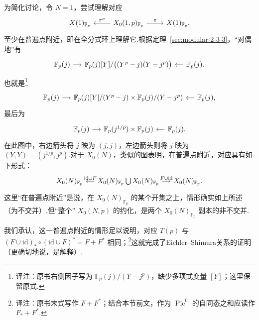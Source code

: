 为简化讨论，令 $N=1$，尝试理解对应
\begin{equation*}
\begin{tikzcd}
X(1)_{\mathbb F_p} & X_0(1,p)_{\mathbb F_p} \arrow[l,"\pi^p"'] \arrow[r,"\pi"] & X(1)_{\mathbb F_p},
\end{tikzcd}
\end{equation*}
至少在普遍点附近，即在全分式环上理解它.根据定理~\ref{sec:modular-2-3-3}，``对偶地''有
\begin{equation*}
\begin{tikzcd}[column sep=small]
\mathbb F_p(j) \arrow[r] & {\mathbb F_p(j)[Y]/\bigl((Y^p-j)(Y-j^p)\bigr)} & \mathbb F_p(j) \arrow[l].
\end{tikzcd}
\end{equation*}
也就是\footnote{译注：原书右侧因子写为 $\mathbb F_p(j)/(Y-j^p)$，缺少多项式变量 $[Y]$；这里保留原式.}
\begin{equation*}
\begin{tikzcd}[column sep=small]
\mathbb F_p(j) \arrow[r] & {\mathbb F_p(j)[Y]/(Y^p-j)\times\mathbb F_p(j)/(Y-j^p)} & \mathbb F_p(j) \arrow[l],
\end{tikzcd}
\end{equation*}
最后为
\begin{equation*}
\begin{tikzcd}[column sep=small]
\mathbb F_p(j) \arrow[r] & {\mathbb F_p(j^{1/p})\times\mathbb F_p(j)} & \mathbb F_p(j) \arrow[l].
\end{tikzcd}
\end{equation*}
在此图中，右边箭头将 $j$ 映为 $(j,j)$，左边箭头则将 $j$ 映为 $(Y,Y)=(j^{1/p},j^p)$.对于 $X_0(N)$，类似的图表明，在普遍点附近，对应具有如下形式：
\begin{equation*}
\begin{tikzcd}[column sep=small]
X_0(N)_{\mathbb F_p} & {X_0(N)_{\mathbb F_p}\bigcup X_0(N)_{\mathbb F_p}} \arrow[l,"\mathrm{id}\cup F"'] \arrow[r,"F\cup\mathrm{id}"] & X_0(N)_{\mathbb F_p}.
\end{tikzcd}
\end{equation*}
这里``在普遍点附近''是说，在 $X_0(N)_{\mathbb F_p}$ 的某个开集之上，情形确实如上所述（为不交并）.但``整个'' $X_0(N,p)$ 的约化，是两个 $X_0(N)_{\mathbb F_p}$ 副本的非不交并.



我们承认，这一普遍点附近的情形足以说明，对应 $T(p)$ 与 $(F\cup\mathrm{id})_*\circ(\mathrm{id}\cup F)^*=F+F^*$ 相同；\footnote{译注：原书末式写作 $F+F^*$；结合本节前文，作为 $\operatorname{Pic}^0$ 的自同态之和应读作 $F_*+F^*$.}这就完成了Eichler--Shimura关系的证明（更确切地说，是解释）.

